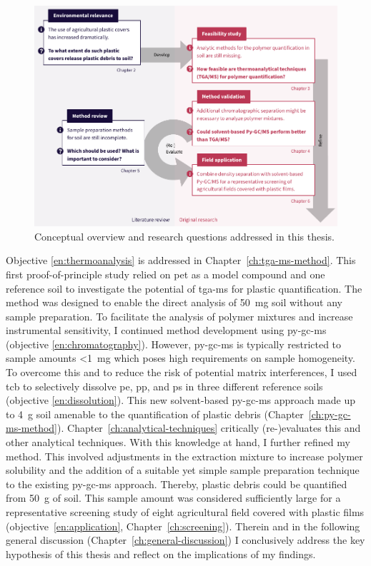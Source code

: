 \begin{figure}
	\centering
	\label{fig:thesis-overview}
	\includegraphics[width=\textwidth]{figures/thesis-overview}
	\caption{Conceptual overview and research questions addressed in this thesis.}
\end{figure}

Objective \ref{en:thermoanalysis} is addressed in Chapter~\ref{ch:tga-ms-method}. This first proof-of-principle study relied on \ac{pet} as a model compound and one reference soil to investigate the potential of \ac{tga-ms} for plastic quantification. The method was designed to enable the direct analysis of \SI{50}{\milli\gram} soil without any sample preparation. To facilitate the analysis of polymer mixtures and increase instrumental sensitivity, I continued method development using \ac{py-gc-ms} (objective \ref{en:chromatography}). However, \ac{py-gc-ms} is typically restricted to sample amounts \SI{<1}{\milli\gram} which poses high requirements on sample homogeneity. To overcome this and to reduce the risk of potential matrix interferences, I used \ac{tcb} to selectively dissolve \ac{pe}, \ac{pp}, and \ac{ps} in three different reference soils (objective \ref{en:dissolution}). This new solvent-based \ac{py-gc-ms} approach made up to \SI{4}{g} soil amenable to the quantification of plastic debris (Chapter~\ref{ch:py-gc-ms-method}). Chapter~\ref{ch:analytical-techniques} critically (re-)evaluates this and other analytical techniques. With this knowledge at hand, I further refined my method. This involved adjustments in the extraction mixture to increase polymer solubility and the addition of a suitable yet simple sample preparation technique to the existing \ac{py-gc-ms} approach. Thereby, plastic debris could be quantified from \SI{50}{g} of soil. This sample amount was considered sufficiently large for a representative screening study of eight agricultural field covered with plastic films (objective~\ref{en:application}, Chapter~\ref{ch:screening}). Therein and in the following general discussion (Chapter~\ref{ch:general-discussion}) I conclusively address the key hypothesis of this thesis and reflect on the implications of my findings.
